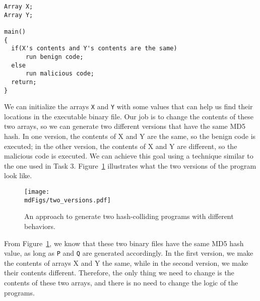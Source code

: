 \begin{lstlisting}
Array X;
Array Y;

main()
{
  if(X's contents and Y's contents are the same)
      run benign code;
  else
      run malicious code;
  return;
}
\end{lstlisting}


We can initialize the arrays \texttt{X} and \texttt{Y} with some values that can help us find
their locations in the executable binary file. Our job is to change the contents of
these two arrays, so we can generate two different versions that have the same MD5 hash. 
In one version, the contents of X and Y are the same, so the benign code is executed;
in the other version, the contents of X and Y are different, so the malicious code 
is executed. We can achieve this goal using a technique similar to the one used in Task 3. 
Figure~\ref{md5:fig:two_versions} illustrates what the two versions of the program look like. 

\begin{figure}[htb]
	\centering
	\texttt{[image: \\mdFigs/two\_versions.pdf]}
	\caption{An approach to generate two hash-colliding programs with different behaviors.}
	\label{md5:fig:two_versions}
\end{figure}

From Figure~\ref{md5:fig:two_versions}, we know that these two binary files have
the same MD5 hash value, as long as \texttt{P} and \texttt{Q} are generated accordingly. 
In the first version, we make the contents of arrays X and Y the same, while in the second
version, we make their contents different. Therefore, the only thing we need to change is the
contents of these two arrays, and there is no need to change the logic of the programs. 


%
%

 



